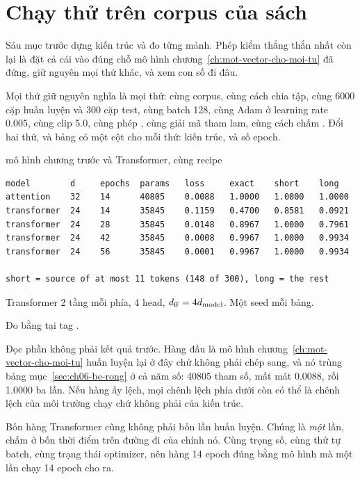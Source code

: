 \section{Chạy thử trên corpus của sách}
\label{sec:ch07-corpus}

%
Sáu mục trước dựng kiến trúc và đo từng mảnh. Phép kiểm thẳng thắn nhất còn lại
là đặt cả cái vào đúng chỗ mô hình chương~\ref{ch:mot-vector-cho-moi-tu} đã
đứng, giữ nguyên mọi thứ khác, và xem con số đi đâu.

Mọi thứ giữ nguyên nghĩa là mọi thứ: cùng corpus, cùng cách chia tập, cùng 6000
cặp huấn luyện và 300 cặp test, cùng batch 128, cùng Adam ở learning rate 0.005,
cùng clip 5.0, cùng phép , cùng giải mã tham
lam, cùng cách chấm . Đổi hai thứ, và bảng có
một cột cho mỗi thứ: kiến trúc, và số
epoch.

\begin{measured}{mô hình chương trước và Transformer, cùng recipe}
\begin{verbatim}
model        d     epochs  params   loss     exact    short    long
attention    32    14      40805    0.0088   1.0000   1.0000   1.0000
transformer  24    14      35845    0.1159   0.4700   0.8581   0.0921
transformer  24    28      35845    0.0148   0.8967   1.0000   0.7961
transformer  24    42      35845    0.0008   0.9967   1.0000   0.9934
transformer  24    56      35845    0.0001   0.9967   1.0000   0.9934

short = source of at most 11 tokens (148 of 300), long = the rest
\end{verbatim}

Transformer 2 tầng mỗi phía, 4 head, \(d_{\mathrm{ff}} = 4d_{\mathrm{model}}\). Một seed mỗi bảng.

Đo bằng  tại tag .
\end{measured}

%
Đọc phần không phải kết quả trước. Hàng đầu là mô hình
chương~\ref{ch:mot-vector-cho-moi-tu} huấn luyện lại ở đây chứ không phải chép
sang, và
nó trùng bảng mục~\ref{sec:ch06-be-rong} ở cả năm số: 40805 tham số, mất mát
0.0088, rồi 1.0000 ba lần. Nếu hàng ấy lệch, mọi chênh lệch phía dưới còn có thể
là chênh lệch của môi trường chạy chứ không phải của kiến trúc.

Bốn hàng Transformer cũng không phải bốn lần huấn luyện. Chúng là \emph{một}
lần, chấm ở bốn thời điểm trên đường đi của chính nó. Cùng trọng số, cùng thứ tự
batch, cùng trạng thái optimizer, nên hàng 14 epoch đúng bằng mô hình mà một
lần chạy 14 epoch cho ra.


